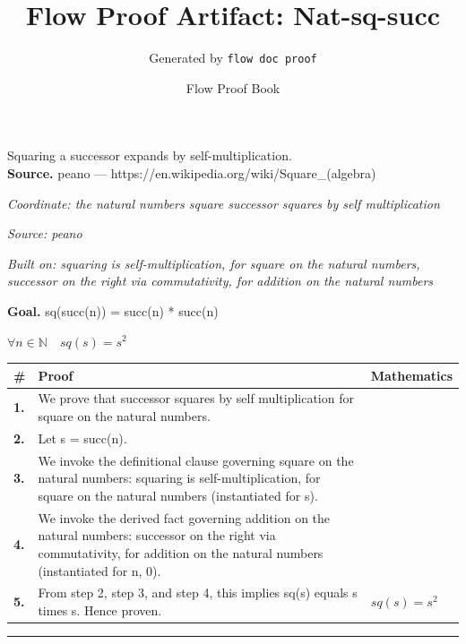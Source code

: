 \documentclass[11pt]{article}
\title{Flow Proof Artifact: Nat-sq-succ}
\author{Generated by \texttt{flow doc proof}}
\date{Flow Proof Book}
\theoremstyle{definition}
\begin{document}
\maketitle
Squaring a successor expands by self-multiplication.\\[0.5em]
\textbf{Source.} peano — https://en.wikipedia.org/wiki/Square\_(algebra)\\[0.5em]
\bigskip
{}\par
\smallskip\noindent\textit{Coordinate: the natural numbers \cdot square \cdot successor squares by self multiplication}\par
\smallskip\noindent\textit{Source: peano}\par
\smallskip\noindent\textit{Built on: squaring is self-multiplication, for square on the natural numbers, successor on the right via commutativity, for addition on the natural numbers}\par
\medskip
\noindent\textbf{Goal.} sq(succ(n)) = succ(n) * succ(n)\par
\noindent$\displaystyle \forall n \in \mathbb{N}\quad sq(s) = s^{2}$\par
\medskip
\noindent
\begin{tabular}{@{} >{\raggedright\arraybackslash}p{} >{\raggedright\arraybackslash}p{} >{\raggedleft\arraybackslash}p{} @{}}
\textbf{\#} & \textbf{Proof} & \textbf{Mathematics} \\
\midrule
\textbf{1.} & We prove that successor squares by self multiplication for square on the natural numbers. & \\[0.45em]
\textbf{2.} & Let s = succ(n). & \\[0.45em]
\textbf{3.} & We invoke the definitional clause governing square on the natural numbers: squaring is self-multiplication, for square on the natural numbers (instantiated for s). & \\[0.45em]
\textbf{4.} & We invoke the derived fact governing addition on the natural numbers: successor on the right via commutativity, for addition on the natural numbers (instantiated for n, 0). & \\[0.45em]
\textbf{5.} & From step 2, step 3, and step 4, this implies sq(s) equals s times s. Hence proven. & $\displaystyle sq(s) = s^{2}$ \\[0.45em]
\bottomrule
\end{tabular}
\label{thm:Nat-square-successor_squares_by_self_multiplication}
\par\medskip\hrule
\end{document}
